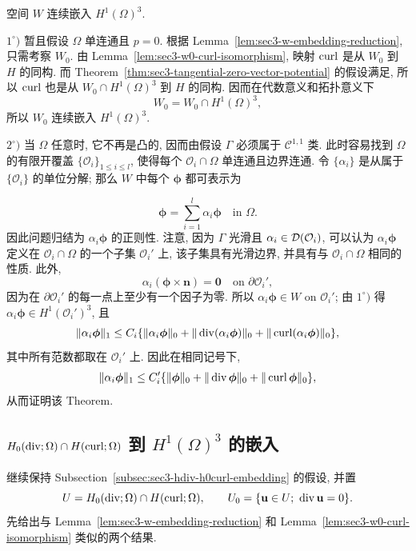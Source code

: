 \setcounter{statement}{6}
\begin{Theorem}\label{thm:sec3-w-h1-embedding}
空间 $W$ 连续嵌入 $H^1(\Omega)^3$.
\end{Theorem}
\begin{Proof}
$1^\circ)$ 暂且假设 $\Omega$ 单连通且 $p=0$. 根据
Lemma~\ref{lem:sec3-w-embedding-reduction}, 只需考察 $W_0$.
由 Lemma~\ref{lem:sec3-w0-curl-isomorphism}, 映射 $\operatorname{curl}$ 是从 $W_0$ 到 $H$ 的同构.
而 Theorem~\ref{thm:sec3-tangential-zero-vector-potential} 的假设满足, 所以
$\operatorname{curl}$ 也是从 $W_0\cap H^1(\Omega)^3$ 到 $H$ 的同构. 因而在代数意义和拓扑意义下
\[
W_0=W_0\cap H^1(\Omega)^3,
\]
所以 $W_0$ 连续嵌入 $H^1(\Omega)^3$.

$2^\circ)$ 当 $\Omega$ 任意时, 它不再是凸的, 因而由假设 $\Gamma$ 必须属于
$\mathcal C^{1,1}$ 类. 此时容易找到 $\Omega$ 的有限开覆盖
$\{\mathcal O_i\}_{1\le i\le l}$, 使得每个 $\mathcal O_i\cap\Omega$ 单连通且边界连通.
令 $\{\alpha_i\}$ 是从属于 $\{\mathcal O_i\}$ 的单位分解; 那么 $W$ 中每个
$\boldsymbol\phi$ 都可表示为

\[
\boldsymbol\phi=\sum_{i=1}^l\alpha_i\boldsymbol\phi
\quad\text{in }\Omega.
\]
因此问题归结为 $\alpha_i\boldsymbol\phi$ 的正则性. 注意, 因为 $\Gamma$ 光滑且
$\alpha_i\in\mathcal{D}(\mathcal O_i)$, 可以认为 $\alpha_i\boldsymbol\phi$ 定义在
$\mathcal O_i\cap\Omega$ 的一个子集 $\mathcal O_i'$ 上, 该子集具有光滑边界,
并具有与 $\mathcal O_i\cap\Omega$ 相同的性质. 此外,
\[
\alpha_i(\boldsymbol\phi\times\mathbf n)=\mathbf0
\quad\text{on }\partial\mathcal O_i',
\]
因为在 $\partial\mathcal O_i'$ 的每一点上至少有一个因子为零.
所以 $\alpha_i\boldsymbol\phi\in W$ on $\mathcal O_i'$; 由 $1^\circ)$ 得
$\alpha_i\boldsymbol\phi\in H^1(\mathcal O_i')^3$, 且
\[
\|\alpha_i\boldsymbol\phi\|_1\le C_i
\{\|\alpha_i\boldsymbol\phi\|_0
+\|\operatorname{div}(\alpha_i\boldsymbol\phi)\|_0
+\|\operatorname{curl}(\alpha_i\boldsymbol\phi)\|_0\},
\]
其中所有范数都取在 $\mathcal O_i'$ 上. 因此在相同记号下,
\[
\|\alpha_i\boldsymbol\phi\|_1\le C_i'
\{\|\boldsymbol\phi\|_0+\|\operatorname{div}\boldsymbol\phi\|_0
+\|\operatorname{curl}\boldsymbol\phi\|_0\},
\]
从而证明该 Theorem.
\end{Proof}

\setcounter{subsection}{4}
\subsection{$H_0(\operatorname{div};\Omega)\cap H(\operatorname{curl};\Omega)$ 到 $H^1(\Omega)^3$ 的嵌入}
\label{subsec:sec3-h0div-hcurl-embedding}

继续保持 Subsection~\ref{subsec:sec3-hdiv-h0curl-embedding} 的假设, 并置
\[
U=H_0(\operatorname{div};\Omega)\cap H(\operatorname{curl};\Omega),
\qquad
U_0=\{\mathbf u\in U;\ \operatorname{div}\mathbf u=0\}.
\]
先给出与 Lemma~\ref{lem:sec3-w-embedding-reduction} 和
Lemma~\ref{lem:sec3-w0-curl-isomorphism} 类似的两个结果.

